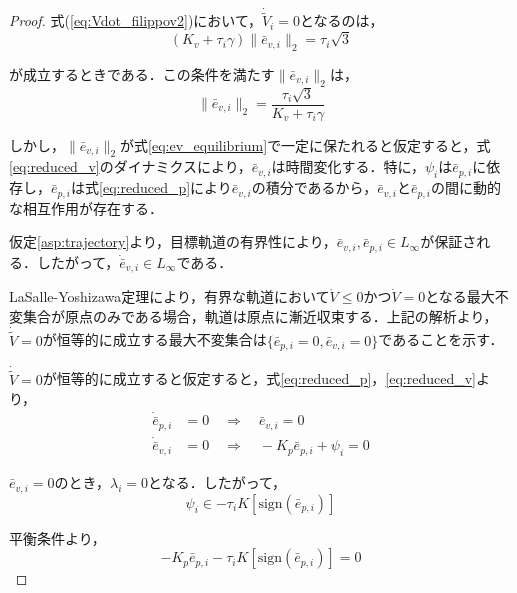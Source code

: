 \documentclass[a4paper]{jarticle}
\theoremstyle{definition}
\theoremstyle{remark}
\numberwithin{equation}{section}
\begin{document}
\begin{proof}
		式(\ref{eq:Vdot_filippov2})において，$\dot{\tilde{V}}_i = 0$となるのは，
		\begin{equation}
			(K_v + \tau_i \gamma) \|\bar{e}_{v,i}\|_2 = \tau_i \sqrt{3}
			\label{eq:Vdot_zero_condition}
		\end{equation}
		
		が成立するときである．この条件を満たす$\|\bar{e}_{v,i}\|_2$は，
		\begin{equation}
			\|\bar{e}_{v,i}\|_2 = \frac{\tau_i \sqrt{3}}{K_v + \tau_i \gamma}
			\label{eq:ev_equilibrium}
		\end{equation}
		
		しかし，$\|\bar{e}_{v,i}\|_2$が式\eqref{eq:ev_equilibrium}で一定に保たれると仮定すると，式\eqref{eq:reduced_v}のダイナミクスにより，$\bar{e}_{v,i}$は時間変化する．特に，$\psi_i$は$\bar{e}_{p,i}$に依存し，$\bar{e}_{p,i}$は式\eqref{eq:reduced_p}により$\bar{e}_{v,i}$の積分であるから，$\bar{e}_{v,i}$と$\bar{e}_{p,i}$の間に動的な相互作用が存在する．
		
		仮定\ref{asp:trajectory}より，目標軌道の有界性により，$\bar{e}_{v,i}, \bar{e}_{p,i} \in L_\infty$が保証される．したがって，$\dot{\bar{e}}_{v,i} \in L_\infty$である．
		
		LaSalle-Yoshizawa定理\cite{yoshi}により，有界な軌道において$\dot{V} \le 0$かつ$\dot{V} = 0$となる最大不変集合が原点のみである場合，軌道は原点に漸近収束する．上記の解析より，$\dot{\tilde{V}} = 0$が恒等的に成立する最大不変集合は$\{\bar{e}_{p,i} = 0, \bar{e}_{v,i} = 0\}$であることを示す．
		
		$\dot{\tilde{V}} = 0$が恒等的に成立すると仮定すると，式\eqref{eq:reduced_p}，\eqref{eq:reduced_v}より，
		\begin{align}
			\dot{\bar{e}}_{p,i} &= 0 \quad \Rightarrow \quad \bar{e}_{v,i} = 0\\
			\dot{\bar{e}}_{v,i} &= 0 \quad \Rightarrow \quad -K_p \bar{e}_{p,i} + \psi_i = 0
		\end{align}
		
		$\bar{e}_{v,i} = 0$のとき，$\lambda_i = 0$となる．したがって，
		\begin{equation}
			\psi_i \in -\tau_i K[\mathrm{sign}(\bar{e}_{p,i})]
			\label{eq:psi_equilibrium}
		\end{equation}
		
		平衡条件より，
		\begin{equation}
			-K_p \bar{e}_{p,i} - \tau_i K[\mathrm{sign}(\bar{e}_{p,i})] = 0
			\label{eq:equilibrium_condition}
		\end{equation}
		

\end{proof}
\end{document}
